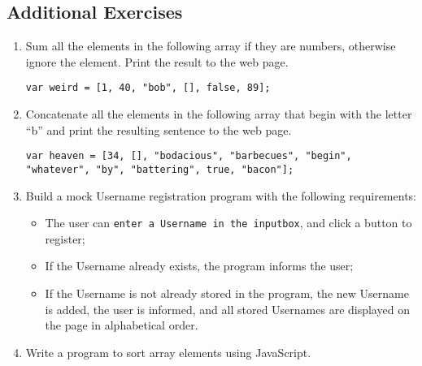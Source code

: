 \documentclass[11pt,a4paper]{article}
\begin{document}
\subsection*{Additional Exercises}
\begin{enumerate}
\item Sum all the elements in the following array if they are numbers, otherwise ignore the element.  Print the result to the web page.\

\texttt{var weird = [1, 40, "bob", [], false, 89];}

\item Concatenate all the elements in the following array that begin with the letter ``b'' and print the resulting sentence to the web page.\

\texttt{var heaven = [34, [], "bodacious", "barbecues", "begin", "whatever", "by", "battering", true, "bacon"];}

\item Build a mock Username registration program with the following requirements:
\begin{itemize}
\item The user can \texttt{enter a Username in the inputbox}, and click a button to register;
\item If the Username already exists, the program informs the user;
\item If the Username is not already stored in the program, the new Username is added, the user is informed, and all stored Usernames are displayed on the page in alphabetical order.
\end{itemize}
\item Write a program to sort array elements using JavaScript.
\end{enumerate}
\end{document}
